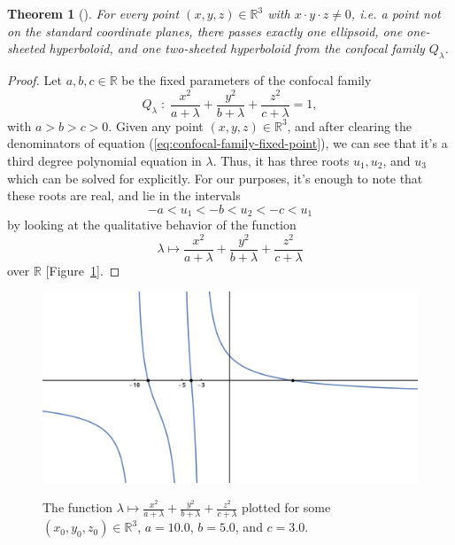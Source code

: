 \documentclass[10pt, a4paper]{article}
\theoremstyle{BoldTopSpacing}
\newtheorem{theorem}{Theorem}[section]
\theoremstyle{BoldTopSpacing}
\theoremstyle{BoldTopSpacing}
\theoremstyle{BoldTopBottomSpacing}
\theoremstyle{BoldTopSpacing}
\theoremstyle{BoldTopBottomSpacing}
\theoremstyle{remark}
\begin{document}
\begin{theorem}[]
\label{thm:fill-up-euclidean-space}
For every point $(x, y, z) \in \mathbb{R}^3$ with $x \cdot y \cdot z \neq 0$, i.e. a point not on the standard coordinate planes, there passes exactly one ellipsoid, one one-sheeted hyperboloid, and one two-sheeted hyperboloid from the confocal family $Q_{\lambda}$.
\end{theorem}

\begin{proof}
    Let $a, b, c \in \mathbb{R}$ be the fixed parameters of the confocal family
\begin{equation}
\label{eq:confocal-family-fixed-point}
    Q_{\lambda} \; : \; \frac{x^2}{a + \lambda} + \frac{y^2}{b + \lambda} + \frac{z^2}{c + \lambda} = 1,
\end{equation}
with $a > b > c > 0$. Given any point $(x, y, z) \in \mathbb{R}^3$, and after clearing the denominators of equation (\ref{eq:confocal-family-fixed-point}), we can see that it's a third degree polynomial equation in $\lambda$. Thus, it has three roots $u_{1}, u_{2}$, and $u_{3}$ which can be solved for explicitly. For our purposes, it's enough to note that these roots are real, and lie in the intervals
\[
    -a < u_{1} < -b < u_{2} < -c < u_{1}
\]
by looking at the qualitative behavior of the function
\[
    \lambda \mapsto \frac{x^2}{a + \lambda} + \frac{y^2}{b + \lambda} + \frac{z^2}{c + \lambda}
\]
over $\mathbb{R}$ [Figure~\ref{fig:plot}].
\end{proof}

\begin{figure}[H]
    \centering
    \includegraphics[width=1.0\textwidth]{graph-for-proof.png}
    \label{fig:graph-for-proof}
    \caption[A plot of the real-valued function $\lambda \mapsto \frac{x^2}{a + \lambda} + \frac{y^2}{b + \lambda} + \frac{z^2}{c + \lambda}$]{The function $\lambda \mapsto \frac{x^2}{a + \lambda} + \frac{y^2}{b + \lambda} + \frac{z^2}{c + \lambda}$ plotted for some $(x_0, y_0, z_0) \in \mathbb{R}^3$, $a = 10.0$, $b = 5.0$, and $c = 3.0$.}
    \label{fig:plot}
\end{figure}
\end{document}
